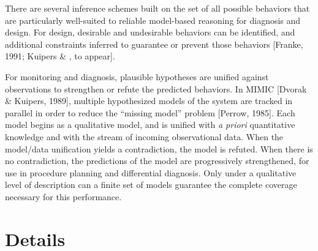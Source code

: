 There are several inference schemes built on the set of all possible
behaviors that are particularly well-suited to reliable model-based
reasoning for diagnosis and design.  For design, desirable and
undesirable behaviors can be identified, and additional constraints
inferred to guarantee or prevent those behaviors [Franke, 1991;
Kuipers \& \Astrom, to appear].

For monitoring and diagnosis, plausible hypotheses are unified against
observations to strengthen or refute the predicted behaviors.  In
MIMIC [Dvorak \& Kuipers, 1989], multiple hypothesized models of the
system are tracked in parallel in order to reduce the ``missing
model'' problem [Perrow, 1985].  Each model begins as a qualitative
model, and is unified with {\em a priori} quantitative knowledge and
with the stream of incoming observational data.  When the model/data
unification yields a contradiction, the model is refuted.  When there
is no contradiction, the predictions of the model are progressively
strengthened, for use in procedure planning and differential
diagnosis.  Only under a qualitative level of description can a finite
set of models guarantee the complete coverage necessary for this
performance.



\section*{Details}

